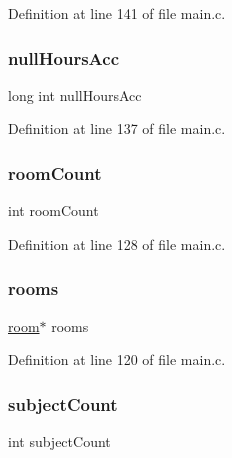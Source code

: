 Definition at line 141 of file main.\+c.

\hypertarget{structparams_a7603f636641dd6762e9a1582394063f0}{}\label{structparams_a7603f636641dd6762e9a1582394063f0} 
\subsubsection{\texorpdfstring{null\+Hours\+Acc}{nullHoursAcc}}
{\footnotesize\ttfamily long int null\+Hours\+Acc}



Definition at line 137 of file main.\+c.

\hypertarget{structparams_a90c3ccdd5d149c3fa002c1bb5bde0a20}{}\label{structparams_a90c3ccdd5d149c3fa002c1bb5bde0a20} 
\subsubsection{\texorpdfstring{room\+Count}{roomCount}}
{\footnotesize\ttfamily int room\+Count}



Definition at line 128 of file main.\+c.

\hypertarget{structparams_a90276c18a08cf33875cf493a4cdaa804}{}\label{structparams_a90276c18a08cf33875cf493a4cdaa804} 
\subsubsection{\texorpdfstring{rooms}{rooms}}
{\footnotesize\ttfamily \hyperlink{structroom}{room}$\ast$ rooms}



Definition at line 120 of file main.\+c.

\hypertarget{structparams_ac4fe83020d0e3e589c5bbdaee56ea773}{}\label{structparams_ac4fe83020d0e3e589c5bbdaee56ea773} 
\subsubsection{\texorpdfstring{subject\+Count}{subjectCount}}
{\footnotesize\ttfamily int subject\+Count}



